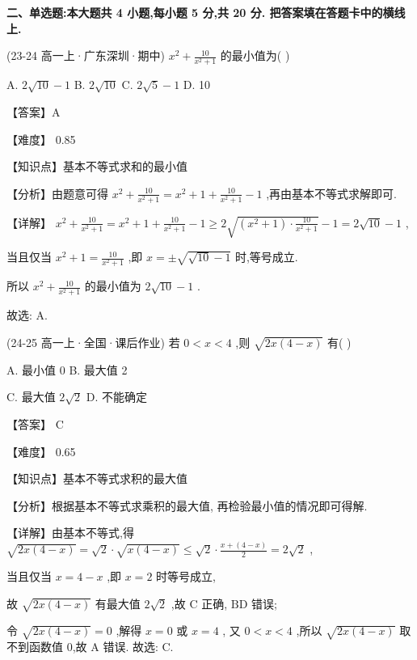 \documentclass[11pt,a4paper]{article}
\begin{document}
\textbf{二、单选题:本大题共 4 小题,每小题 5 分,共 20 分. 把答案填在答题卡中的横线上.}
\begin{hmwk} 
 (23-24 高一上·广东深圳·期中) \(\displaystyle {x}^{2} + \frac{10}{{x}^{2} + 1}\) 的最小值为(   )

A. \(\displaystyle 2\sqrt{10} - 1\) B. \(\displaystyle 2\sqrt{10}\) C. \(\displaystyle 2\sqrt{5} - 1\) D. 10

\begin{jiexi}
【答案】A

【难度】 0.85

【知识点】基本不等式求和的最小值

【分析】由题意可得 \(\displaystyle {x}^{2} + \frac{10}{{x}^{2} + 1} = {x}^{2} + 1 + \frac{10}{{x}^{2} + 1} - 1\) ,再由基本不等式求解即可.

【详解】 \(\displaystyle {x}^{2} + \frac{10}{{x}^{2} + 1} = {x}^{2} + 1 + \frac{10}{{x}^{2} + 1} - 1 \geq  2\sqrt{\left( {{x}^{2} + 1}\right)  \cdot  \frac{10}{{x}^{2} + 1}} - 1 = 2\sqrt{10} - 1\) ,

当且仅当 \(\displaystyle {x}^{2} + 1 = \frac{10}{{x}^{2} + 1}\) ,即 \(\displaystyle x =  \pm  \sqrt{\sqrt{10} - 1}\) 时,等号成立.

所以 \(\displaystyle {x}^{2} + \frac{10}{{x}^{2} + 1}\) 的最小值为 \(\displaystyle 2\sqrt{10} - 1\) .

故选: A.

\end{jiexi}
\end{hmwk}
\begin{hmwk} 
 (24-25 高一上·全国·课后作业) 若 \(\displaystyle 0 < x < 4\) ,则 \(\displaystyle \sqrt{{2x}\left( {4 - x}\right) }\) 有(   )

A. 最小值 0 B. 最大值 2

C. 最大值 \(\displaystyle 2\sqrt{2}\) D. 不能确定

\begin{jiexi}
【答案】 \(\displaystyle \mathrm{C}\)

【难度】 0.65

【知识点】基本不等式求积的最大值

【分析】根据基本不等式求乘积的最大值, 再检验最小值的情况即可得解.

【详解】由基本不等式,得 \(\displaystyle \sqrt{{2x}\left( {4 - x}\right) } = \sqrt{2} \cdot  \sqrt{x\left( {4 - x}\right) } \leq  \sqrt{2} \cdot  \frac{x + \left( {4 - x}\right) }{2} = 2\sqrt{2}\) ,

当且仅当 \(\displaystyle x = 4 - x\) ,即 \(\displaystyle x = 2\) 时等号成立,

故 \(\displaystyle \sqrt{{2x}\left( {4 - x}\right) }\) 有最大值 \(\displaystyle 2\sqrt{2}\) ,故 \(\displaystyle \mathrm{C}\) 正确, \(\displaystyle \mathrm{{BD}}\) 错误;

令 \(\displaystyle \sqrt{{2x}\left( {4 - x}\right) } = 0\) ,解得 \(\displaystyle x = 0\) 或 \(\displaystyle x = 4\) , 又 \(\displaystyle 0 < x < 4\) ,所以 \(\displaystyle \sqrt{{2x}\left( {4 - x}\right) }\) 取不到函数值 0,故 \(\displaystyle \mathrm{A}\) 错误. 故选: C. 

\end{jiexi}
\end{hmwk}
\end{document}
